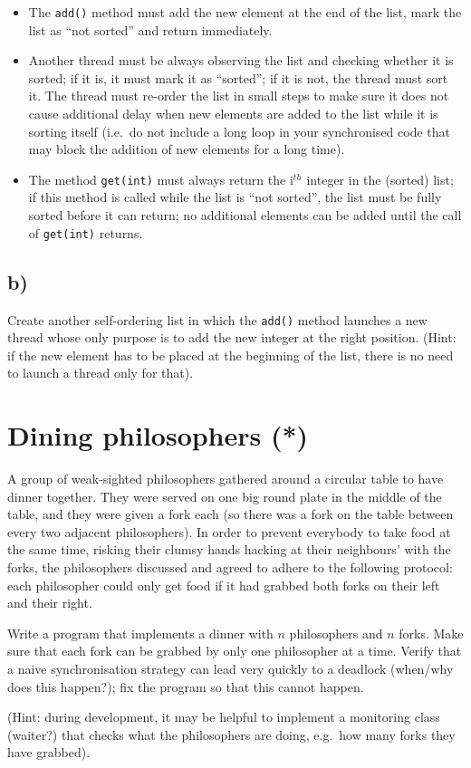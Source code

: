 \documentclass{article}
\begin{document}
\begin{itemize}
\item The \verb+add()+ method must add the new element at the end
  of the list, mark the list as ``not sorted'' and return immediately.
\item Another thread must be always observing the list and checking whether
  it is sorted; if it is, it must mark it as ``sorted''; if it is
  not, the thread must sort it. The thread must re-order 
  the list in small steps
  to make sure it does not cause additional delay when new elements
  are added to the list while it is sorting itself (i.e.~do not
  include a long loop in your synchronised code that may block the
  addition of new elements for a long time).
\item The method \verb+get(int)+ must always return the i$^{th}$
  integer in the (sorted) list; if this method is called while the
  list is ``not sorted'', the list must be fully sorted before it can
  return; no additional elements can be added until the call of
  \verb+get(int)+ returns.
\end{itemize}

\subsection{b)}
\label{sec:b}

Create another self-ordering list in which the \verb+add()+ method
launches a new thread whose only purpose is to add the new integer at
the right position. (Hint: if the new element has to be placed at the
beginning of the list, there is no need to launch a thread only for
that). 


\section{Dining philosophers (*)}
\label{sec:dining-philosophers}

A group of weak-sighted philosophers gathered around a circular table
to have dinner together. They were served on one big round plate in
the middle of the table, and they were given a fork each (so there was
a fork on the table between every two adjacent philosophers). In order to
prevent everybody to take food at the same time, risking their clumsy
hands hacking at their neighbours' with the forks, 
the philosophers discussed and agreed to adhere to the following
protocol: each philosopher could only get food if it had grabbed both
forks on their left and their right. 

Write a program that implements a dinner with $n$ philosophers and $n$
forks. Make sure that each fork can be grabbed by only one philosopher
at a time. Verify that a naive synchronisation strategy can lead very
quickly to a deadlock (when/why does this happen?); 
fix the program so that this cannot happen. 

(Hint: during development, it may be helpful to implement a monitoring
class (waiter?)  that checks what the philosophers are doing, e.g.~how
many forks they have grabbed).
\end{document}
